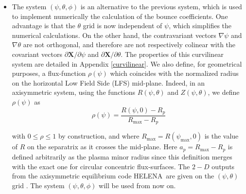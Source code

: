 \begin{itemize}

\item  The system $\left( \psi ,\theta ,\phi \right) $ is an alternative to
the previous system, which is used to implement numerically the calculation
of the bounce coefficients. One advantage is that the $\theta $ grid is now
independent of $\psi $, which simplifies the numerical calculations. On the
other hand, the contravariant vectors $\nabla \psi $ and $\nabla \theta $
are not orthogonal, and therefore are not respectively colinear with the
covariant vectors $\partial \mathbf{X}/\partial \psi $ and $\partial \mathbf{
X}/\partial \theta $. The properties of this curvilinear system are detailed
in Appendix \ref{curvilinear}. We also define, for geometrical purposes, a
flux-function $\rho \left( \psi \right) $ which coincides with the
normalized radius on the horizontal Low Field Side (LFS) mid-plane. Indeed,
in an axisymmetric system, using the functions $R\left( \psi ,\theta \right)
$ and $Z\left( \psi ,\theta \right) $, we define $\rho \left( \psi \right) $
as
\begin{equation}
\rho \left( \psi \right) =\frac{R\left( \psi ,0\right) -R_{p}}{R_{\max
}-R_{p}}  \label{rhodef}
\end{equation}


with $0\leq \rho \leq 1$ by construction, and where $R_{\max }=R\left( \psi
_{\max },0\right) $ is the value of $R$ on the separatrix as it crosses the
mid-plane. Here $a_{p}=R_{\max }-R_{p}$ 
is defined arbitrarily as the plasma
minor radius since this definition merges with the exact one for circular
concentric flux-surfaces. The $2-D$ outputs from the axisymmetric
equilibrium code HELENA\ are given on the $\left( \psi ,\theta \right) $
grid \cite{huy91}. The system $\left( \psi ,\theta ,\phi \right) $ will be
used from now on.
\end{itemize}
